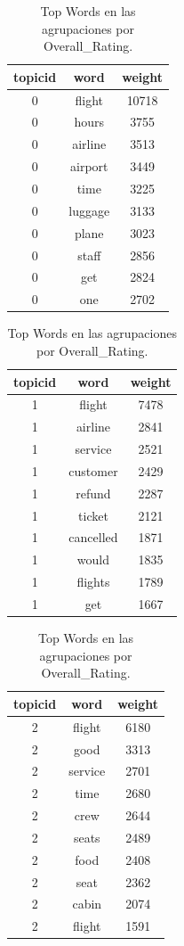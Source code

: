 \documentclass[es]{uc3mreport}
\begin{document}
\begin{report}
\begin{table}[H]
    \center
    \begin{tabular}{@{}ccc@{}}
        \toprule
        topicid & word & weight \\
        \midrule
        0 & flight  & 10718 \\
        0 & hours   & 3755  \\
        0 & airline & 3513  \\
        0 & airport & 3449  \\
        0 & time    & 3225  \\
        0 & luggage & 3133  \\
        0 & plane   & 3023  \\
        0 & staff   & 2856  \\
        0 & get     & 2824  \\
        0 & one     & 2702  \\
        \bottomrule
    \end{tabular}
    \hspace{2.5mm}
    \begin{tabular}{@{}ccc@{}}
        \toprule
        topicid & word & weight \\
        \midrule
        1 & flight  & 7478  \\
        1 & airline & 2841  \\
        1 & service & 2521  \\
        1 & customer& 2429  \\
        1 & refund  & 2287  \\
        1 & ticket  & 2121  \\
        1 & cancelled& 1871 \\
        1 & would   & 1835  \\
        1 & flights & 1789  \\
        1 & get     & 1667  \\
        \bottomrule
    \end{tabular}
    \hspace{2.5mm}
    \begin{tabular}{@{}ccc@{}}
        \toprule
        topicid & word & weight \\
        \midrule
        2 & flight  & 6180  \\
        2 & good    & 3313  \\
        2 & service & 2701  \\
        2 & time    & 2680  \\
        2 & crew    & 2644  \\
        2 & seats   & 2489  \\
        2 & food    & 2408  \\
        2 & seat    & 2362  \\
        2 & cabin   & 2074  \\
        2 & flight  & 1591  \\
        \bottomrule
    \end{tabular}
    \caption{Top Words en las agrupaciones por Overall\_Rating.}
\end{table}


\end{report}
\end{document}
